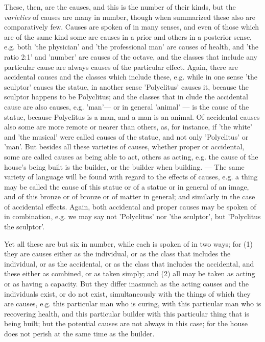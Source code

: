 These, then, are the causes, and this is the number of their kinds, but the \emph{varieties} of causes are many in number, though when summarized these also are comparatively few. Causes are spoken of in many senses, and even of those which are of the same kind some are causes in a prior and others in a posterior sense, e.g. both 'the physician' and 'the professional man' are causes of health, and 'the ratio 2:1' and 'number' are causes of the octave, and the classes that include any particular cause are always causes of the particular effect. Again, there are accidental causes and the classes which include these, e.g. while in one sense 'the sculptor' causes the statue, in another sense 'Polyclitus' causes it, because the sculptor happens to be Polyclitus; and the classes that in clude the accidental cause are also causes, e.g. 'man'— or in general 'animal' — is the cause of the statue, because Polyclitus is a man, and a man is an animal. Of accidental causes also some are more remote or nearer than others, as, for instance, if 'the white' and 'the musical' were called causes of the statue, and not only 'Polyclitus' or 'man'. But besides all these varieties of causes, whether proper or accidental, some are called causes as being able to act, others as acting, e.g. the cause of the house's being built is the builder, or the builder when building. — The same variety of language will be found with regard to the effects of causes, e.g. a thing may be called the cause of this statue or of a statue or in general of an image, and of this bronze or of bronze or of matter in general; and similarly in the case of accidental effects. Again, both accidental and proper causes may be spoken of in combination, e.g. we may say not 'Polyclitus' nor 'the sculptor', but 'Polyclitus the sculptor'.

Yet all these are but six in number, while each is spoken of in two ways; for (1) they are causes either as the individual, or as the class that includes the individual, or as the accidental, or as the class that includes the accidental, and these either as combined, or as taken simply; and (2) all may be taken as acting or as having a capacity. But they differ inasmuch as the acting causes and the individuals exist, or do not exist, simultaneously with the things of which they are causes, e.g. this particular man who is curing, with this particular man who is recovering health, and this particular builder with this particular thing that is being built; but the potential causes are not always in this case; for the house does not perish at the same time as the builder.

